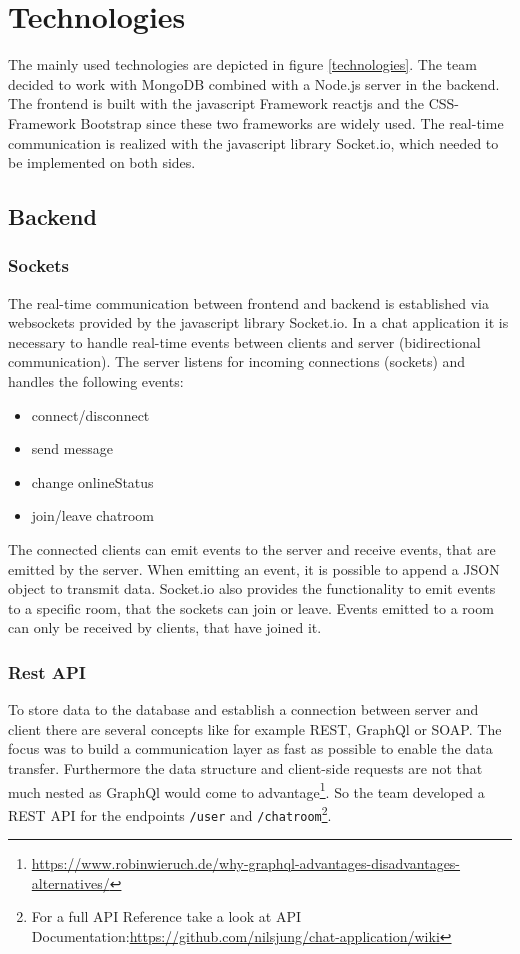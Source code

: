 \section{Technologies}
The mainly used technologies are depicted in figure \ref{technologies}.
The team decided to work with MongoDB combined with a Node.js server in the backend. The frontend is built with the javascript Framework reactjs and the CSS-Framework Bootstrap since these two frameworks are widely used.
The real-time communication is realized with the javascript library Socket.io, which needed to be implemented on both sides.

\subsection{Backend}
\subsubsection{Sockets}
The real-time communication between frontend and backend is established via websockets provided by the javascript library Socket.io.
In a chat application it is necessary to handle real-time events between clients and server (bidirectional communication).
The server listens for incoming connections (sockets) and handles the following events:

\begin{itemize}
	\item connect/disconnect
	\item send message
	\item change onlineStatus
	\item join/leave chatroom
\end{itemize}

The connected clients can emit events to the server and receive events, that are emitted by the server. When emitting an event, it is possible to append a JSON object to transmit data.
Socket.io also provides the functionality to emit events to a specific room, that the sockets can join or leave. Events emitted to a room can only be received by clients, that have joined it.

\subsubsection{Rest API}
To store data to the database and establish a connection between server and client there are several concepts like for example REST, GraphQl or SOAP. The focus was to build a communication layer as fast as possible to enable the data transfer. Furthermore the data structure and client-side requests are not that much nested as GraphQl would come to advantage\footnote{\url{https://www.robinwieruch.de/why-graphql-advantages-disadvantages-alternatives/}}. So the team developed a REST API for the endpoints \texttt{/user} and \texttt{/chatroom}\footnote{For a full API Reference take a look at API Documentation:\url{https://github.com/nilsjung/chat-application/wiki}}. 
